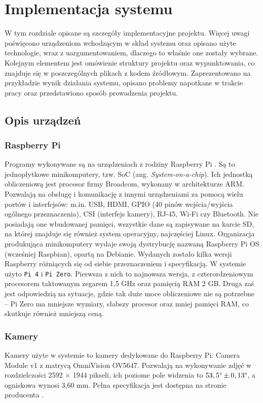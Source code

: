 \chapter{Implementacja systemu}
\thispagestyle{chapterBeginStyle}

W tym rozdziale opisane są szczegóły implementacyjne projektu. Więcej uwagi poświęcono urządzeniom wchodzącym w skład systemu oraz opisano użyte technologie, wraz z uargumentowaniem, dlaczego to właśnie one zostały wybrane. Kolejnym elementem jest omówienie struktury projektu oraz wypunktowania, co znajduje się w poszczególnych plikach z kodem źródłowym. Zaprezentowano na przykładzie wynik działania systemu, opisano problemy napotkane w trakcie pracy oraz przedstawiono sposób prowadzenia projektu.

\section{Opis urządzeń}

\subsection{Raspberry Pi}
Programy wykonywane są na urządzeniach z rodziny Raspberry Pi \cite{RPi}. Są to jednopłytkowe minikomputery, tzw. SoC (ang. \textit{System-on-a-chip}). Ich jednostką obliczeniową jest procesor firmy Broadcom, wykonany w architekturze ARM. Pozwalają na obsługę i komunikację z innymi urządzeniami za pomocą wielu portów i interfejsów: m.in. USB, HDMI, GPIO (40 pinów wejścia/wyjścia ogólnego przeznaczenia), CSI (interfejs kamery), RJ-45, Wi-Fi czy Bluetooth. Nie posiadają one wbudowanej pamięci, wszystkie dane są zapisywane na karcie SD, na której znajduje się również system operacyjny, najczęściej Linux. Organizacja produkująca minikomputery wydaje swoją dystrybucję nazwaną Raspberry Pi OS (wcześniej Raspbian), opartą na Debianie. Wydanych zostało kilka wersji Raspberry różniących się od siebie przeznaczeniem i specyfikacją. W systemie użyto \verb|Pi 4| i \verb|Pi Zero|. Pierwsza z nich to najnowsza wersja, z czterordzeniowym procesorem taktowanym zegarem 1,5 GHz oraz pamięcią RAM 2 GB. Druga zaś jest odpowiedzią na sytuacje, gdzie tak duże moce obliczeniowe nie są potrzebne -- Pi Zero ma mniejsze wymiary, słabszy procesor oraz mniej pamięci RAM, co skutkuje również mniejszą ceną.
\subsection{Kamery}
Kamery użyte w systemie to kamery dedykowane do Raspberry Pi: Camera Module v1 z matrycą OmniVision OV5647. Pozwalają na wykonywanie zdjęć w rozdzielczości 2592 $\times$ 1944 pikseli, ich poziome pole widzenia to $53,5 \degree \pm 0,13 \degree$, a ogniskowa wynosi 3,60 mm. Pełna specyfikacja jest dostępna na stronie producenta \cite{RPi}.

